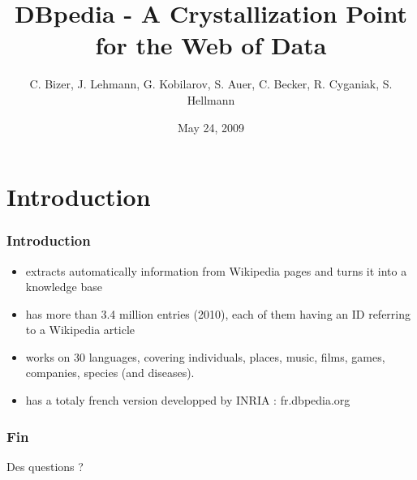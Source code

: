 \documentclass{beamer}
\title{DBpedia - A Crystallization Point for the Web of Data}
\author{C. Bizer, J. Lehmann, G. Kobilarov, S. Auer, C. Becker, R. Cyganiak, S. Hellmann}
\date{May 24, 2009}
\begin{document}
  	
  	\begin{frame}
  		
  		\titlepage
  	\end{frame}
  	
  	\section{Introduction}
  	\begin{frame}
  		\frametitle{Introduction}
  		\begin{itemize}
  			\item extracts automatically information from Wikipedia pages and turns it into a knowledge base
  			\item has more than 3.4 million entries (2010), each of them having an ID referring to a Wikipedia article
  			\item works on 30 languages, covering individuals, places, music, films, games, companies, species (and diseases). 
  			\item has a totaly french version developped by INRIA : fr.dbpedia.org
  		\end{itemize}
  	\end{frame}
  	
  	
  	
  	
  	\begin{frame}
  		\frametitle{Fin}
  		Des questions ?
  	\end{frame}
  	
  
\end{document}
